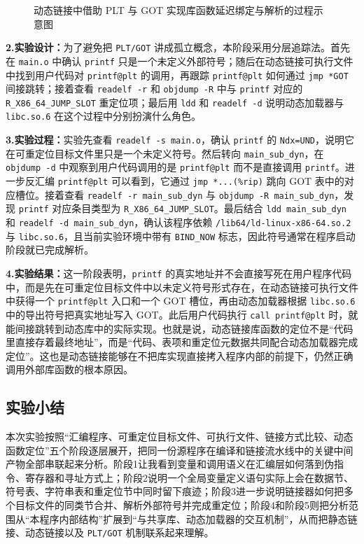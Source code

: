 \documentclass[supercite]{Experimental_Report}
\newcommand{\xfig}[3]{
  \begin{figure}[htb]
    \centering
    #3
    \caption{#2}
    \label{fig:#1}
  \end{figure}
}
\theoremstyle{definition}
\begin{document}
\xfig{lab5-pltgot}{动态链接中借助 PLT 与 GOT 实现库函数延迟绑定与解析的过程示意图}{\resizebox{0.85\textwidth}{!}{}}

\noindent\textbf{2.实验设计：}为了避免把 \texttt{PLT/GOT} 讲成孤立概念，本阶段采用分层追踪法。首先在 \texttt{main.o} 中确认 \texttt{printf} 只是一个未定义外部符号；随后在动态链接可执行文件中找到用户代码对 \texttt{printf@plt} 的调用，再跟踪 \texttt{printf@plt} 如何通过 \texttt{jmp *GOT} 间接跳转；接着查看 \texttt{readelf -r} 和 \texttt{objdump -R} 中与 \texttt{printf} 对应的 \texttt{R\_X86\_64\_JUMP\_SLOT} 重定位项；最后用 \texttt{ldd} 和 \texttt{readelf -d} 说明动态加载器与 \texttt{libc.so.6} 在这个过程中分别扮演什么角色。

\noindent\textbf{3.实验过程：}实验先查看 \texttt{readelf -s main.o}，确认 \texttt{printf} 的 \texttt{Ndx=UND}，说明它在可重定位目标文件里只是一个未定义符号。然后转向 \texttt{main\_sub\_dyn}，在 \texttt{objdump -d} 中观察到用户代码调用的是 \texttt{printf@plt} 而不是直接调用 \texttt{printf}。进一步反汇编 \texttt{printf@plt} 可以看到，它通过 \texttt{jmp *...(\%rip)} 跳向 GOT 表中的对应槽位。接着查看 \texttt{readelf -r main\_sub\_dyn} 与 \texttt{objdump -R main\_sub\_dyn}，发现 \texttt{printf} 对应条目类型为 \texttt{R\_X86\_64\_JUMP\_SLOT}。最后结合 \texttt{ldd main\_sub\_dyn} 和 \texttt{readelf -d main\_sub\_dyn}，确认该程序依赖 \texttt{/lib64/ld-linux-x86-64.so.2} 与 \texttt{libc.so.6}，且当前实验环境中带有 \texttt{BIND\_NOW} 标志，因此符号通常在程序启动阶段就已完成解析。

\noindent\textbf{4.实验结果：}这一阶段表明，\texttt{printf} 的真实地址并不会直接写死在用户程序代码中，而是先在可重定位目标文件中以未定义符号形式存在，在动态链接可执行文件中获得一个 \texttt{printf@plt} 入口和一个 GOT 槽位，再由动态加载器根据 \texttt{libc.so.6} 中的导出符号把真实地址写入 GOT。此后用户代码执行 \texttt{call printf@plt} 时，就能间接跳转到动态库中的实际实现。也就是说，动态链接库函数的定位不是“代码里直接存着最终地址”，而是“代码、表项和重定位元数据共同配合动态加载器完成定位”。这也是动态链接能够在不把库实现直接拷入程序内部的前提下，仍然正确调用外部库函数的根本原因。

\subsection{实验小结}
本次实验按照“汇编程序、可重定位目标文件、可执行文件、链接方式比较、动态函数定位”五个阶段逐层展开，把同一份源程序在编译和链接流水线中的关键中间产物全部串联起来分析。阶段1让我看到变量和调用语义在汇编层如何落到伪指令、寄存器和寻址方式上；阶段2说明一个全局变量定义语句实际上会在数据节、符号表、字符串表和重定位节中同时留下痕迹；阶段3进一步说明链接器如何把多个目标文件的同类节合并、解析外部符号并完成重定位；阶段4和阶段5则把分析范围从“本程序内部结构”扩展到“与共享库、动态加载器的交互机制”，从而把静态链接、动态链接以及 \texttt{PLT/GOT} 机制联系起来理解。
\end{document}
